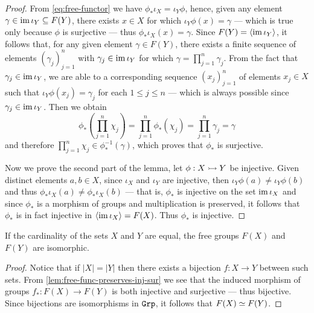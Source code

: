 \begin{proof}
From \cref{eq:free-functor} we have \(\phi_{*} \iota_{X} = \iota_{Y} \phi\),
hence, given any element \(\gamma \in \operatorname{im} \iota_{Y} \subseteq F(Y)\), there
exists \(x \in X\) for which \(\iota_{Y} \phi(x) = \gamma\) --- which is true
only because \(\phi\) is surjective --- thus \(\phi_{*} \iota_X(x) = \gamma\).
Since \(F(Y) = \langle \operatorname{im} \iota_Y \rangle\), it follows that, for any given
element \(\gamma \in F(Y)\), there exists a finite sequence of elements
\((\gamma_j)_{j=1}^n\) with \(\gamma_j \in \operatorname{im} \iota_Y\) for which \(\gamma =
\prod_{j=1}^n \gamma_j\). From the fact that \(\gamma_{j} \in \operatorname{im} \iota_Y\), we
are able to a corresponding sequence \((x_j)_{j=1}^n\) of elements \(x_j \in X\)
such that \(\iota_{Y} \phi(x_j) = \gamma_j\) for each \(1 \leq j \leq n\) ---
which is always possible since \(\gamma_j \in \operatorname{im} \iota_Y\). Then we obtain
\[
  \phi_{*}\left( \prod_{j=1}^n \chi_j \right) = \prod_{j=1}^n \phi_{*}(\chi_j)
  = \prod_{j=1}^n \gamma_j = \gamma
\]
and therefore \(\prod_{j=1}^n \chi_j \in \phi_{*}^{-1}(\gamma)\), which proves
that \(\phi_{*}\) is surjective.

Now we prove the second part of the lemma, let \(\phi: X \rightarrowtail Y\) be
injective. Given distinct elements \(a, b \in X\), since \(\iota_X\) and
\(\iota_Y\) are injective, then \(\iota_{Y} \phi(a) \neq \iota_Y \phi(b)\) and
thus \(\phi_{*}\iota_X(a) \neq \phi_{*}\iota_X(b)\) --- that is, \(\phi_{*}\) is
injective on the set \(\operatorname{im} \iota_X\) and since \(\phi_{*}\) is a morphism of
groups and multiplication is preserved, it follows that \(\phi_{*}\) is in fact
injective in \(\langle \operatorname{im} \iota_X \rangle = F(X)\). Thus \(\phi_{*}\) is
injective.
\end{proof}

\begin{proposition}\label{prop:iso-free-grp}
If the cardinality of the sets \(X\) and \(Y\) are equal, the free groups
\(F(X)\) and \(F(Y)\) are isomorphic.
\end{proposition}

\begin{proof}
Notice that if \(|X| = |Y|\) then there exists a bijection \(f: X \to Y\)
between such sets. From \cref{lem:free-func-preserves-inj-sur} we see that the
induced morphism of groups \(f_{*}: F(X) \to F(Y)\) is both injective and
surjective --- thus bijective. Since bijections are isomorphisms in \({\texttt{Grp}}\), it
follows that \(F(X) \simeq F(Y)\).
\end{proof}


